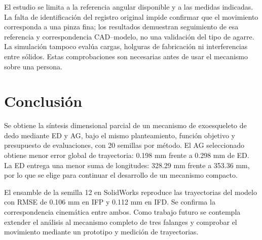 \documentclass[conference,letterpaper]{IEEEtran}
\begin{document}
El estudio se limita a la referencia angular disponible y a las medidas indicadas. La falta de identificación del registro original impide confirmar que el movimiento corresponda a una pinza fina; los resultados demuestran seguimiento de esa referencia y correspondencia CAD--modelo, no una validación del tipo de agarre. La simulación tampoco evalúa cargas, holguras de fabricación ni interferencias entre sólidos. Estas comprobaciones son necesarias antes de usar el mecanismo sobre una persona.

\section{Conclusión}
Se obtiene la síntesis dimensional parcial de un mecanismo de exoesqueleto de dedo mediante ED y AG, bajo el mismo planteamiento, función objetivo y presupuesto de evaluaciones, con 20 semillas por método. El AG seleccionado obtiene menor error global de trayectoria: 0.198 mm frente a 0.298 mm de ED. La ED entrega una menor suma de longitudes: 328.29 mm frente a 353.36 mm, por lo que se elige para continuar el desarrollo de un mecanismo compacto.

El ensamble de la semilla 12 en SolidWorks reproduce las trayectorias del modelo con RMSE de 0.106 mm en IFP y 0.112 mm en IFD. Se confirma la correspondencia cinemática entre ambos. Como trabajo futuro se contempla extender el análisis al mecanismo completo de tres falanges y comprobar el movimiento mediante un prototipo y medición de trayectorias.

\ifdefined\versionciega
\else
  \newpage
\fi

\end{document}
